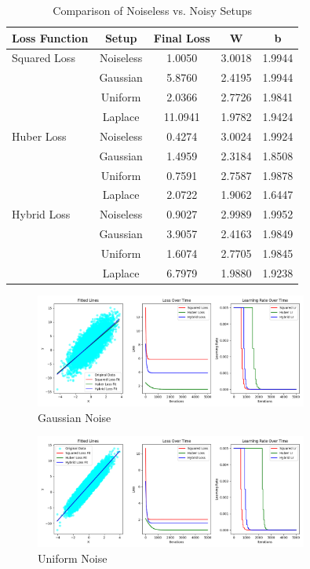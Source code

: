 \documentclass{article}
\begin{document}
\begin{table}[h]
    \centering
    \caption{Comparison of Noiseless vs. Noisy Setups}
    \label{tab:noise_comparison}
    \begin{tabular}{lcccc}
        \toprule
        \textbf{Loss Function} & \textbf{Setup} & \textbf{Final Loss} & \textbf{W} & \textbf{b} \\
        \midrule
        Squared Loss & Noiseless & 1.0050 & 3.0018 & 1.9944 \\
                     & Gaussian  & 5.8760 & 2.4195 & 1.9944 \\
                     & Uniform   & 2.0366 & 2.7726 & 1.9841 \\
                     & Laplace   & 11.0941 & 1.9782 & 1.9424 \\
        Huber Loss   & Noiseless & 0.4274 & 3.0024 & 1.9924 \\
                     & Gaussian  & 1.4959 & 2.3184 & 1.8508 \\
                     & Uniform   & 0.7591 & 2.7587 & 1.9878 \\
                     & Laplace   & 2.0722 & 1.9062 & 1.6447 \\
        Hybrid Loss  & Noiseless & 0.9027 & 2.9989 & 1.9952 \\
                     & Gaussian  & 3.9057 & 2.4163 & 1.9849 \\
                     & Uniform   & 1.6074 & 2.7705 & 1.9845 \\
                     & Laplace   & 6.7979 & 1.9880 & 1.9238 \\
        \bottomrule
    \end{tabular}
\end{table}

\begin{figure}[h]
    \centering
    \includegraphics[width=0.8\textwidth]{assets/gaussian_noise.png}
    \caption{Gaussian Noise}
    \label{fig:gaussian_noise_curve}
\end{figure}

\begin{figure}[h]
    \centering
    \includegraphics[width=0.8\textwidth]{assets/uniform_noise.png}
    \caption{Uniform Noise}
    \label{fig:uniform_noise_curve}
\end{figure}
\end{document}
